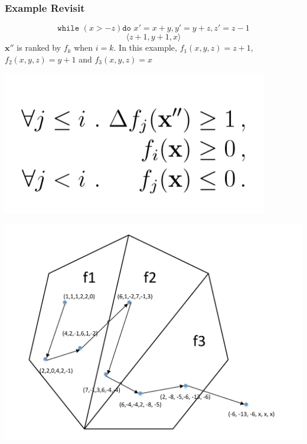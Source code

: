\documentclass[11pt]{beamer}
\begin{document}
\begin{frame}\frametitle{Example Revisit}
\[\texttt{while }( x > -z) \texttt{do } x' = x + y, y' = y + z, z' = z - 1\]
\[\langle z + 1, y + 1, x \rangle\]
$\textbf{x}''$ is ranked by $f_k$ when $i = k$. In this example, $f_1(x, y, z) = z + 1$, $f_2(x, y, z) = y + 1$ and $f_3(x, y, z) = x$
\begin{center}
\includegraphics[scale = 0.2]{3.PNG}

\includegraphics[scale = 0.3]{3.pdf}
\end{center}
\end{frame}
\end{document}
